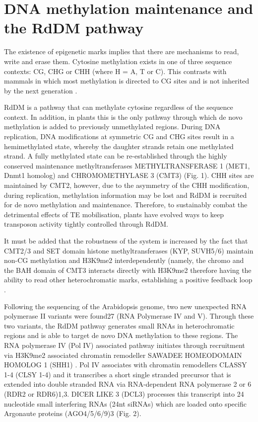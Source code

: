 \section{DNA methylation maintenance and the RdDM pathway} %

The existence of epigenetic marks implies that there are mechanisms to read, write and erase them. Cytosine methylation exists in one of three sequence contexts: CG, CHG or CHH (where H = A, T or C).  This contrasts with mammals in  which most methylation is directed to CG sites  and is not inherited by the next generation \citep{RN228}. 

RdDM is a pathway that can methylate cytosine regardless of the sequence context. In addition, in plants this is the only pathway through which de novo methylation is added to previously unmethylated regions. During DNA replication, DNA modifications at symmetric CG and CHG sites result in a hemimethylated state, whereby the daughter strands retain one methylated strand. A fully methylated state can be re-established through the highly conserved maintenance methyltransferases METHYLTRANSFERASE 1 (MET1, Dnmt1 homolog) and CHROMOMETHYLASE 3 (CMT3) (Fig. 1). CHH sites are maintained by CMT2, however, due to the asymmetry of the CHH modification, during replication, methylation information may be lost and RdDM is recruited for de novo methylation and maintenance. Therefore, to sustainably combat the detrimental effects of TE mobilisation, plants have evolved ways to keep transposon activity tightly controlled through RdDM.

It must be added that the robustness of the system is increased by the fact that CMT2/3 and SET domain histone methyltransferases (KYP, SUVH5/6) maintain non-CG methylation and H3K9me2 interdependently (namely, the chromo and the BAH domain of CMT3 interacts directly with H3K9me2 therefore having the ability to read other heterochromatic marks, establishing a positive feedback loop \citep{RN33}.

Following  the sequencing of the Arabidopsis genome, two new unexpected RNA polymerase II variants were found27 (RNA Polymerase IV and V). Through these two variants, the RdDM pathway generates small RNAs in heterochromatic regions and is able to target de novo DNA methylation to these regions. 
The RNA polymerase IV (Pol IV) associated pathway initiates through recruitment via H3K9me2 associated chromatin remodeller SAWADEE HOMEODOMAIN HOMOLOG 1 (SHH1) \citep{RN116}. Pol IV associates with chromatin remodellers CLASSY 1-4 (CLSY 1-4) and it transcribes a short single stranded precursor \citep{RN117} that is extended into double stranded RNA via RNA-dependent RNA polymerase 2 or 6 (RDR2 or RDR6)1,3. DICER LIKE 3 (DCL3) processes this transcript into 24 nucleotide small interfering RNAs (24nt siRNAs) which are loaded onto specific Argonaute proteins (AGO4/5/6/9)3 (Fig. 2).


